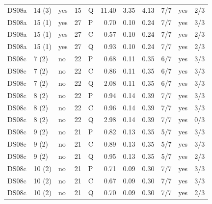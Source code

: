\documentclass[10pt]{article}
\begin{document}
{\begin{longtable}{lllrlrrrrlr}
DS08a & 14 (3) & yes & 15 & Q & 11.40 & 3.35 & 4.13 & 7/7 & yes & 2/3 \\
DS08a & 15 (1) & yes & 27 & P & 0.70 & 0.10 & 0.24 & 7/7 & yes & 3/3 \\
DS08a & 15 (1) & yes & 27 & C & 0.57 & 0.10 & 0.24 & 7/7 & yes & 2/3 \\
DS08a & 15 (1) & yes & 27 & Q & 0.93 & 0.10 & 0.24 & 7/7 & yes & 2/3 \\
\midrule
DS08c & 7 (2) & no & 22 & P & 0.68 & 0.11 & 0.35 & 6/7 & yes & 3/3 \\
DS08c & 7 (2) & no & 22 & C & 0.86 & 0.11 & 0.35 & 6/7 & yes & 3/3 \\
DS08c & 7 (2) & no & 22 & Q & 2.08 & 0.11 & 0.35 & 6/7 & yes & 3/3 \\
DS08c & 8 (2) & no & 22 & P & 0.94 & 0.14 & 0.39 & 7/7 & yes & 3/3 \\
DS08c & 8 (2) & no & 22 & C & 0.96 & 0.14 & 0.39 & 7/7 & yes & 3/3 \\
DS08c & 8 (2) & no & 22 & Q & 2.98 & 0.14 & 0.39 & 7/7 & yes & 0/3 \\
DS08c & 9 (2) & no & 21 & P & 0.82 & 0.13 & 0.35 & 5/7 & yes & 3/3 \\
DS08c & 9 (2) & no & 21 & C & 0.89 & 0.13 & 0.35 & 5/7 & yes & 3/3 \\
DS08c & 9 (2) & no & 21 & Q & 0.95 & 0.13 & 0.35 & 5/7 & yes & 2/3 \\
DS08c & 10 (2) & no & 21 & P & 0.71 & 0.09 & 0.30 & 7/7 & yes & 3/3 \\
DS08c & 10 (2) & no & 21 & C & 0.67 & 0.09 & 0.30 & 7/7 & yes & 3/3 \\
DS08c & 10 (2) & no & 21 & Q & 0.70 & 0.09 & 0.30 & 7/7 & yes & 2/3 \\
\end{longtable}
\vspace{-0.6em}
}
\end{document}
